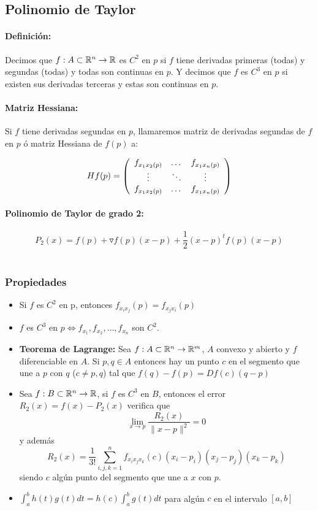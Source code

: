\subsection{Polinomio de Taylor}

\paragraph{Definición:}Decimos que $f:A\subset\mathbb{R}^n\to\mathbb{R}$ es $C^2$ en $p$ si $f$ tiene derivadas primeras (todas) y segundas (todas) y todas son continuas en $p$. Y decimos que $f$ es $C^3$ en $p$ si existen sus derivadas terceras y estas son continuas en $p$.

\paragraph{Matriz Hessiana:} Si $f$ tiene derivadas segundas en $p$, llamaremos matriz de derivadas segundas de $f$ en $p$ ó matriz Hessiana de $f(p)$ a:

\begin{equation}
    Hf(p) = \left(
    \begin{array}{c c c}
        f_{x_1x_2(p)} & \dots & f_{x_1x_n(p)}  \\
         \vdots& \ddots & \vdots \\
        f_{x_1x_2(p)} & \dots & f_{x_1x_n(p)}
    \end{array}
    \right)
\end{equation}

\paragraph{Polinomio de Taylor de grado 2:}  $$P_2(x) = f(p) + \triangledown f(p)(x-p) + \frac{1}{2}(x-p)^tf(p)(x-p)$$
\
\subsubsection{Propiedades}

\begin{itemize}
\item Si $f$ es $C^2$ en p, entonces $f_{x_ix_j}(p) = f_{x_jx_i}(p)$
\item $f$ es $C^3$ en $p\iff f_{x_1},f_{x_2},\dots,f_{x_n}$ son $C^2$.
\item \textbf{Teorema de Lagrange:} Sea $f:A\subset\mathbb{R}^n\to\mathbb{R}^m$, $A$ convexo y abierto y $f$ diferenciable en $A$. Si $p,q\in A$ entonces hay un punto $c$ en el segmento que une a $p$ con $q$ ($c\neq p,q$) tal que $f(q)-f(p) = Df(c)(q-p)$

\item Sea $f:B\subset\mathbb{R}^n\to\mathbb{R}$, si $f$ es $C^3$ en $B$, entonces el error $R_2(x) = f(x) - P_2(x)$ verifica que $$\lim_{x\to p} \frac{R_2(x)}{\|x-p\|^2} = 0$$ y además $$R_2(x) = \frac{1}{3!}\sum_{i,j,k=1}^n f_{x_ix_jx_k}(c)(x_i - p_i)(x_j-p_j)(x_k-p_k)$$
siendo $c$ algún punto del segmento que une a $x$ con $p$.

\item $\int_a^b h(t)g(t)dt = h(c)\int_a^b g(t)dt$ para algún $c$ en el intervalo $[a,b]$
\end{itemize}
\newpage

